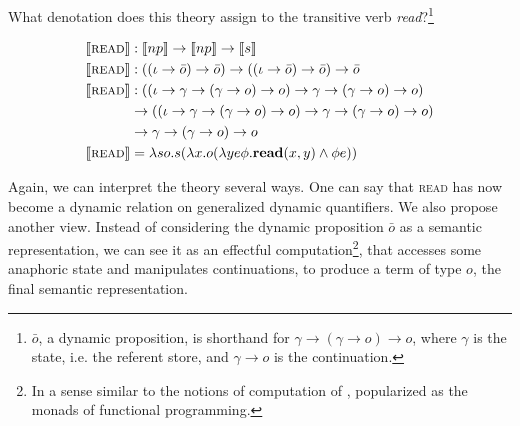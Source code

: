 \documentclass{article}
\newcommand{\sem}[1]{\llbracket #1 \rrbracket}
\begin{document}
What denotation does this theory assign to the transitive verb
\emph{read}?\footnote{$\bar{o}$, a dynamic proposition, is shorthand for
  $\gamma \to (\gamma \to o) \to o$, where $\gamma$ is the state, i.e. the
  referent store, and $\gamma \to o$ is the continuation.}

\begin{align*}
  \sem{\textsc{read}} & : \sem{np} \to \sem{np} \to \sem{s} \\
  \sem{\textsc{read}} & : ((\iota \to \bar{o}) \to \bar{o}) \to
                          ((\iota \to \bar{o}) \to \bar{o}) \to
                          \bar{o} \\
  \sem{\textsc{read}} & : ((\iota \to \gamma \to (\gamma \to o) \to o)
                           \to \gamma \to (\gamma \to o) \to o) \\ & \to
                          ((\iota \to \gamma \to (\gamma \to o) \to o)
                           \to \gamma \to (\gamma \to o) \to o) \\ & \to
                           \gamma \to (\gamma \to o) \to o \\
  \sem{\textsc{read}} & = \lambda s o. s (\lambda x. o (\lambda y e
  \phi. \textbf{read}(x, y) \land \phi e))
\end{align*}

Again, we can interpret the theory several ways. One can say that
\textsc{read} has now become a dynamic relation on generalized dynamic
quantifiers. We also propose another view. Instead of considering the dynamic
proposition $\bar{o}$ as a semantic representation, we can see it as an
effectful computation\footnote{In a sense similar to the notions of
  computation of \citet{moggi1991notions} , popularized as the monads of
  functional programming.}, that accesses some anaphoric state and manipulates
continuations, to produce a term of type $o$, the final semantic
representation.





\end{document}
